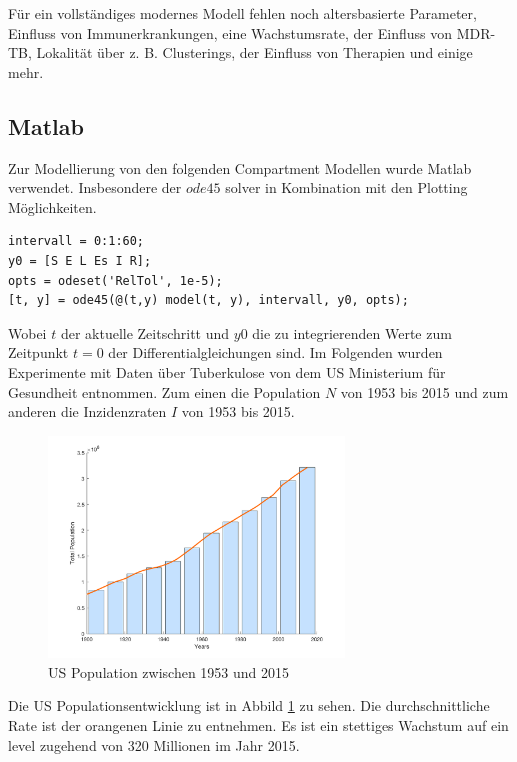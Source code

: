 \documentclass[paper=a4, fontsize=11pt, ngerman, abstract=on]{scrartcl}
\numberwithin{equation}{section} %
\numberwithin{figure}{section} %
\numberwithin{table}{section} %
\begin{document}
Für ein vollständiges modernes Modell fehlen noch altersbasierte Parameter, Einfluss von Immunerkrankungen, eine Wachstumsrate, der Einfluss von MDR-TB, Lokalität über z. B. Clusterings, der Einfluss von Therapien und einige mehr. \cite{MathOfInfectiousDiseases2000}

\subsection{Matlab}

Zur Modellierung von den folgenden Compartment Modellen wurde Matlab verwendet. Insbesondere der $ode45$ solver in Kombination mit den Plotting Möglichkeiten.

\begin{lstlisting}[style=matlab]
intervall = 0:1:60;
y0 = [S E L Es I R];
opts = odeset('RelTol', 1e-5);
[t, y] = ode45(@(t,y) model(t, y), intervall, y0, opts);
\end{lstlisting}

Wobei $t$ der aktuelle Zeitschritt und $y0$ die zu integrierenden Werte zum Zeitpunkt $t = 0$ der Differentialgleichungen sind. Im Folgenden wurden Experimente mit Daten über Tuberkulose von dem US Ministerium für Gesundheit entnommen. Zum einen die Population $N$ von 1953 bis 2015 und zum anderen die Inzidenzraten $I$ von 1953 bis 2015.

\begin{figure}[ht]
\centering
\includegraphics[width=0.7\textwidth,keepaspectratio]{images/us-population}
\caption{US Population zwischen 1953 und 2015}
\label{fig:us-population}
\end{figure}

Die US Populationsentwicklung ist in Abbild \ref{fig:us-population} zu sehen. Die durchschnittliche Rate ist der orangenen Linie zu entnehmen. Es ist ein stettiges Wachstum auf ein level zugehend von 320 Millionen im Jahr 2015.
\end{document}
